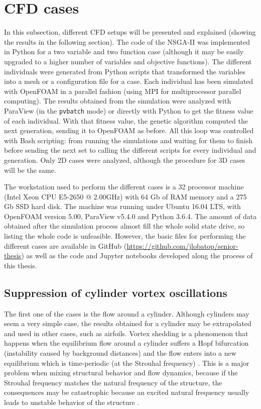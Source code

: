 \newpage

\section{CFD cases}

In this subsection, different CFD setups will be presented and explained (showing the results in the following section). The code of the NSGA-II was implemented in Python for a two variable and two function case (although it may be easily upgraded to a higher number of variables and objective functions). The different individuals were generated from Python scripts that transformed the variables into a mesh or a configuration file for a case. Each individual has been simulated with OpenFOAM in a parallel fashion (using MPI for multiprocessor parallel computing). The results obtained from the simulation were analyzed with ParaView (in the \texttt{pvbatch} mode) or directly with Python to get the fitness value of each individual. With that fitness value, the genetic algorithm computed the next generation, sending it to OpenFOAM as before. All this loop was controlled with Bash scripting: from running the simulations and waiting for them to finish before sending the next set to calling the different scripts for every individual and generation. Only 2D cases were analyzed, although the procedure for 3D cases will be the same.

The workstation used to perform the different cases is a 32 processor machine (Intel Xeon CPU E5-2650 @ 2.00GHz) with 64 Gb of RAM memory and a 275 Gb SSD hard disk. The machine was running under Ubuntu 16.04 LTS, with OpenFOAM version 5.00, ParaView v5.4.0 and Python 3.6.4. The amount of data obtained after the simulation process almost fill the whole solid state drive, so listing the whole code is unfeasible. However, the basic files for performing the different cases are available in GitHub (\url{https://github.com/jlobatop/senior-thesis}) as well as the code and Jupyter notebooks developed along the process of this thesis. 

\subsection{Suppression of cylinder vortex oscillations}

The first one of the cases is the flow around a cylinder. Although cylinders may seem a very simple case, the results obtained for a cylinder may be extrapolated and used in other cases, such as airfoils. Vortex shedding is a phenomenon that happens when the equilibrium flow around a cylinder suffers a Hopf bifurcation (instability caused by background distances) and the flow enters into a new equilibrium which is time-periodic (at the Strouhal frequency) \cite{sengupta2010dynamical}. This is a major problem when mixing structural behavior and flow dynamics, because if the Strouhal frequency matches the natural frequency of the structure, the consequences may be catastrophic because an excited natural frequency usually leads to unstable behavior of the structure \cite{green2006failure}.


